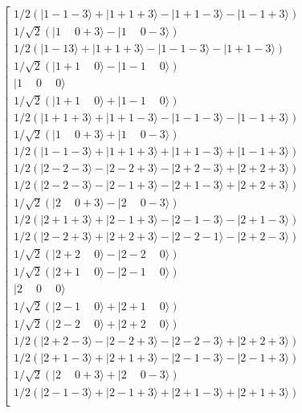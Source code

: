 \documentclass{article}
\begin{document}
\begin{equation}
\left[
\begin{array}{c}
	1/2(|1-1-3\rangle + |1+1+3\rangle - |1+1-3\rangle - |1-1+3\rangle) \\
	1/\sqrt{2}(|1\mspace{22mu}0+3\rangle - |1\mspace{22mu}0-3\rangle) \\
	1/2(|1-1 3\rangle + |1+1+3\rangle - |1-1-3\rangle - |1+1-3\rangle) \\
	1/\sqrt{2}(|1+1\mspace{22mu}0\rangle - |1-1\mspace{22mu}0\rangle) \\
	|1\mspace{22mu}0\mspace{22mu}0\rangle \\
	1/\sqrt{2}(|1+1\mspace{22mu}0\rangle + |1-1\mspace{22mu}0\rangle) \\
	1/2(|1+1+3\rangle + |1+1-3\rangle - |1-1-3\rangle - |1-1+3\rangle) \\
	1/\sqrt{2}(|1\mspace{22mu}0+3\rangle + |1\mspace{22mu}0-3\rangle) \\
	1/2(|1-1-3\rangle + |1+1+3\rangle + |1+1-3\rangle + |1-1+3\rangle) \\
	1/2(|2-2-3\rangle - |2-2+3\rangle - |2+2-3\rangle + |2+2+3\rangle) \\
	1/2(|2-2-3\rangle - |2-1+3\rangle - |2+1-3\rangle + |2+2+3\rangle) \\
	1/\sqrt{2}(|2\mspace{22mu}0+3\rangle - |2\mspace{22mu}0-3\rangle) \\
	1/2(|2+1+3\rangle + |2-1+3\rangle - |2-1-3\rangle - |2+1-3\rangle) \\
	1/2(|2-2+3\rangle + |2+2+3\rangle - |2-2-1\rangle - |2+2-3\rangle) \\
	1/\sqrt{2}(|2+2\mspace{22mu}0\rangle - |2-2\mspace{22mu}0\rangle) \\
	1/\sqrt{2}(|2+1\mspace{22mu}0\rangle - |2-1\mspace{22mu}0\rangle) \\
	|2\mspace{22mu}0\mspace{22mu}0\rangle \\
	1/\sqrt{2}(|2-1\mspace{22mu}0\rangle + |2+1\mspace{22mu}0\rangle) \\
	1/\sqrt{2}(|2-2\mspace{22mu}0\rangle + |2+2\mspace{22mu}0\rangle) \\
	1/2(|2+2-3\rangle - |2-2+3\rangle - |2-2-3\rangle + |2+2+3\rangle) \\
	1/2(|2+1-3\rangle + |2+1+3\rangle - |2-1-3\rangle - |2-1+3\rangle) \\
	1/\sqrt{2}(|2\mspace{22mu}0+3\rangle + |2\mspace{22mu}0-3\rangle) \\
	1/2(|2-1-3\rangle + |2-1+3\rangle + |2+1-3\rangle + |2+1+3\rangle) \\

\end{array}
\end{equation}
\end{document}
